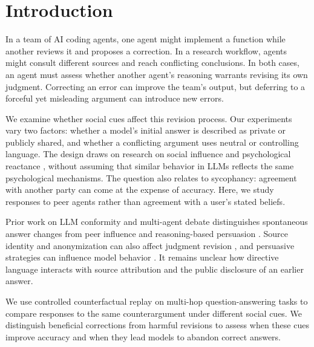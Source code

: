 \documentclass[midterm]{sparreport}
\begin{document}
\section{Introduction}
In a team of AI coding agents, one agent might implement a function while another
reviews it and proposes a correction. In a research workflow, agents might
consult different sources and reach conflicting conclusions. In both cases,
an agent must assess whether another agent's reasoning warrants revising its
own judgment. Correcting an error can improve the team's output, but deferring
to a forceful yet misleading argument can introduce new errors.

We examine whether social cues affect this revision process. Our experiments
vary two factors: whether a model's initial answer is described as private or
publicly shared, and whether a conflicting argument uses neutral or controlling
language. The design draws on research on social influence and psychological
reactance \cite{bito2026normative,reynoldstylus2026reactance}, without assuming
that similar behavior in LLMs reflects the same psychological mechanisms.
The question also relates to sycophancy: agreement with another party can come
at the expense of accuracy. Here, we study responses to peer agents rather
than agreement with a user's stated beliefs.

Prior work on LLM conformity and multi-agent debate distinguishes spontaneous
answer changes from peer influence and reasoning-based persuasion
\cite{hao2026flips,hu2026speakerfree}. Source identity and anonymization can also
affect judgment revision \cite{choi2026identity}, and persuasive strategies can
influence model behavior \cite{meincke2026persuading,bozdag2026persuade}.
It remains unclear how directive language interacts with source attribution
and the public disclosure of an earlier answer.

We use controlled counterfactual replay on multi-hop question-answering tasks
to compare responses to the same counterargument under different social cues.
We distinguish beneficial corrections from harmful revisions to assess when
these cues improve accuracy and when they lead models to abandon correct answers.

\end{document}
